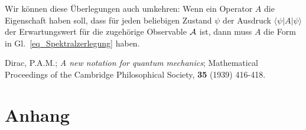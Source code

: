 Wir k\"onnen diese \"Uberlegungen auch umkehren: Wenn ein Operator $A$ die Eigenschaft
haben soll, dass f\"ur jeden beliebigen Zustand $\psi$ der Ausdruck $\langle \psi |A| \psi \rangle$
der Erwartungswert f\"ur die zugeh\"orige Observable ${\cal A}$ ist, dann muss $A$ die Form in 
Gl.\ \ref{eq_Spektralzerlegung} haben.  



\begin{thebibliography}{99}
 Dirac, P.A.M.; {\em A new notation for quantum mechanics}; Mathematical
        Proceedings of the Cambridge Philosophical Society, {\bf 35} (1939) 416-418.

\end{thebibliography}

\section{Anhang}
